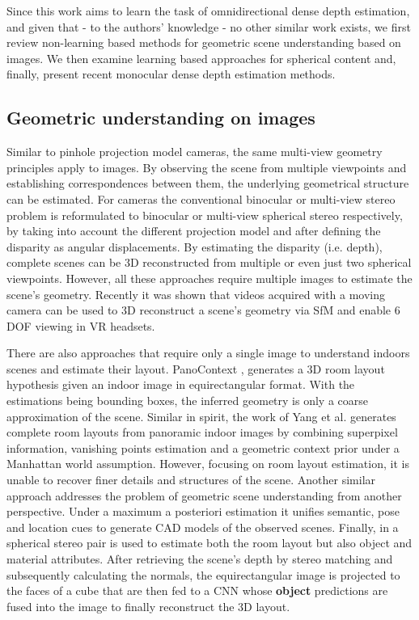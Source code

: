 Since this work aims to learn the task of omnidirectional dense depth estimation, and given that - to the authors' knowledge - no other similar work exists, we first review non-learning based methods for geometric scene understanding based on  images. We then examine learning based approaches for spherical content and, finally, present recent monocular dense depth estimation methods.

\subsection{Geometric understanding on  images}
\label{sec:360geometry}
Similar to pinhole projection model cameras, the same multi-view geometry \cite{hartley2000multiple} principles apply to  images. By observing the scene from multiple viewpoints and establishing correspondences between them, the underlying geometrical structure can be estimated. For  cameras the conventional binocular or multi-view stereo \cite{furukawa2015multi} problem is reformulated to binocular or multi-view spherical stereo \cite{li2008binocular} respectively, by taking into account the different projection model and after defining the disparity as angular displacements. By estimating the disparity (i.e. depth), complete scenes can be 3D reconstructed from multiple \cite{kim2013scenereconstruction,li2005spherical} or even just two \cite{ma20153d,pathak2016dense} spherical viewpoints. However, all these approaches require multiple  images to estimate the scene's geometry. Recently it was shown that  videos acquired with a moving camera can be used to 3D reconstruct a scene's geometry via SfM \cite{huang20176} and enable 6 DOF viewing in VR headsets. 

There are also approaches that require only a single image to understand indoors scenes and estimate their layout. PanoContext \cite{zhang2014panocontext}, generates a 3D room layout hypothesis given an indoor  image in equirectangular format. With the estimations being bounding boxes, the inferred geometry is only a coarse approximation of the scene. Similar in spirit, the work of Yang et al. \cite{yang2016efficient} generates complete room layouts from panoramic indoor images by combining superpixel information, vanishing points estimation and a geometric context prior under a Manhattan world assumption. However, focusing on room layout estimation, it is unable to recover finer details and structures of the scene. Another similar approach \cite{xu2017pano2cad} addresses the problem of geometric scene understanding from another perspective. Under a maximum a posteriori estimation it unifies semantic, pose and location cues to generate CAD models of the observed scenes. Finally, in \cite{kim2016room} a spherical stereo pair is used to estimate  both the room layout but also object and material attributes. After retrieving the scene's depth by stereo matching and subsequently calculating the normals, the equirectangular image is projected to the faces of a cube that are then fed to a CNN whose \textbf{object} predictions are fused into the  image to finally reconstruct the 3D layout. 

